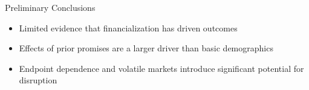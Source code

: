 \documentclass{beamer}
\begin{document}
\begin{frame}{\textmd{Preliminary Conclusions}}
\begin{itemize}
	\item Limited evidence that financialization has driven outcomes
	\item Effects of prior promises are a larger driver than basic demographics
	\item Endpoint dependence and volatile markets introduce significant potential for disruption
\end{itemize}
	
\end{frame}
\end{document}
